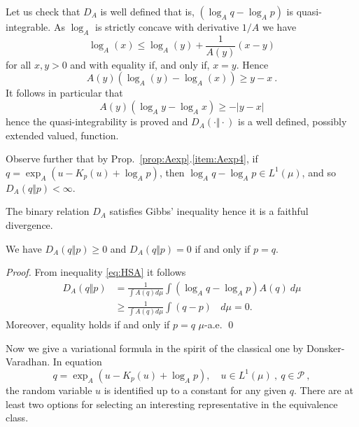 \documentclass[graybox]{svmult}
\begin{document}
Let us check that $D_A$ is well defined that is, $\left( \log _{A}q-\log _{A}p\right)$ is quasi-integrable. As $\log_A$ is strictly concave with derivative $1/A$ we have
\begin{equation*}
\log _{A}\left( x\right) \leq \log _{A}\left( y\right) +\frac{1}{A\left(
y\right) }\left( x-y\right)
\end{equation*}
for all $x,y>0$ and with equality if, and only if, $x=y.$ Hence 
\begin{equation}\label{eq:HSA}
A\left( y\right) \left( \log _{A}\left( y\right) -\log _{A}\left( x\right)
\right) \geq y-x\ .  
\end{equation}
It follows in particular that 
\begin{equation*}
A\left( y\right) \left( \log _{A}y-\log _{A}x\right) \geq -\left\vert
y-x\right\vert 
\end{equation*}
hence the quasi-integrability is proved and $D_{A}(\cdot \Vert \cdot )$ is a well defined, possibly extended valued, function.

Observe further that by Prop.~\ref{prop:Aexp}.\ref{item:Aexp4}, if $q = \exp_A(u - K_p(u) + \log_A p)$, then $\log _{A}q-\log _{A}p \in L^{1}\left( \mu \right) $, and so 
$D_{A}(q\Vert p)<\infty $.

The binary relation $D_{A}$ satisfies Gibbs' inequality hence it is a faithful divergence.

\begin{proposition}
We have $D_{A}(q\Vert p)\geq 0$ and $D_{A}(q\Vert p)=0$ if and only if $p=q$.
\end{proposition}

\begin{proof}
From inequality \eqref{eq:HSA} it follows
\begin{align*}
D_{A}(q\Vert p) &=\frac{1}{\int A\left( q\right) d\mu }\int \left( \log
_{A}q-\log _{A}p\right) A\left( q\right) \ d\mu \\
&\geq \frac{1}{\int A\left( q\right) d\mu }\int \left( q-p\right) \text{ } \ d\mu =0.
\end{align*}
Moreover, equality holds if and only if $p=q$ $\mu $-a.e. \qed
\end{proof}

Now we give a variational formula in the spirit of the classical one by
Donsker-Varadhan. In equation
%
\begin{equation} \label{eq:expmodel1}
q = \exp _{A}(u-K_p(u)+\log _{A}p),\quad u\in L^{1}(\mu )\ , \ q \in \mathcal P \ ,
\end{equation}
the random variable $u$ is identified up to a constant for any given $q$.
There are at least two options for selecting an interesting representative
in the equivalence class.
\end{document}

